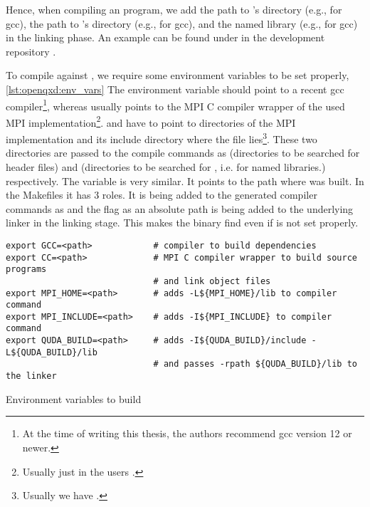 
Hence, when compiling an \openqxd program, we add the path to \quda's  directory (e.g.,  for gcc), the path to \quda's  directory (e.g.,  for gcc), and the named library (e.g.,  for gcc) in the linking phase. An example  can be found under  in the \openqxd development repository \cite{gitlab:openqxd-devel}.

To compile \openqxd against \quda, we require some environment variables to be set properly, \cref{lst:openqxd:env_vars}
The environment variable  should point to a recent gcc compiler\footnote{At the time of writing this thesis, the authors recommend gcc version 12 or newer.}, whereas  usually points to the MPI C compiler wrapper of the used MPI implementation\footnote{Usually just  in the users .}.
 and  have to point to directories of the MPI implementation and its include directory where the file  lies\footnote{Usually we have .}.
These two directories are passed to the compile commands as  (directories to be searched for header files) and  (directories to be searched for , i.e. for named libraries.) respectively.
The variable  is very similar.
It points to the path where \quda was built.
In the Makefiles it has 3 roles.
It is being added to the generated compiler commands as  and the flag  as an absolute path is being added to the underlying linker in the linking stage.
This makes the binary find  even if  is not set properly.
\begin{codelisting}
\begin{verbatim}
export GCC=<path>            # compiler to build dependencies
export CC=<path>             # MPI C compiler wrapper to build source programs
                             # and link object files
export MPI_HOME=<path>       # adds -L${MPI_HOME}/lib to compiler command
export MPI_INCLUDE=<path>    # adds -I${MPI_INCLUDE} to compiler command
export QUDA_BUILD=<path>     # adds -I${QUDA_BUILD}/include -L${QUDA_BUILD}/lib
                             # and passes -rpath ${QUDA_BUILD}/lib to the linker
\end{verbatim}
\caption{Environment variables to build \openqxd}
\label{lst:openqxd:env_vars}
\end{codelisting}

